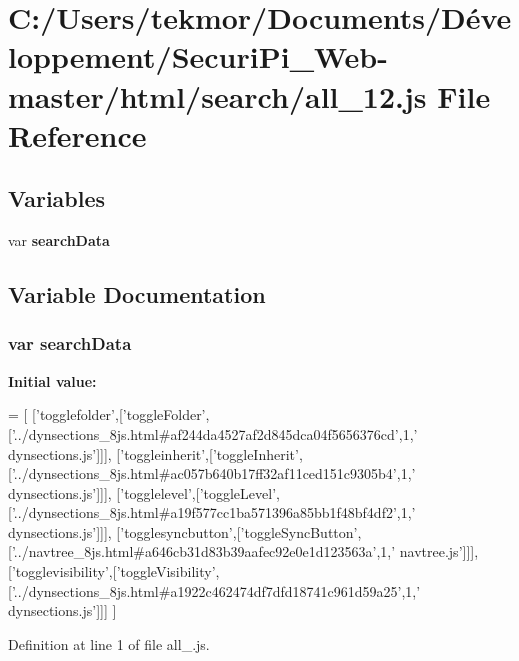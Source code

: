 \section{C\+:/\+Users/tekmor/\+Documents/\+Développement/\+Securi\+Pi\+\_\+\+Web-\/master/html/search/all\+\_\+12.js File Reference}
\label{all__12_8js}
\subsection*{Variables}
\begin{DoxyCompactItemize}
\item 
var {\bf search\+Data}
\end{DoxyCompactItemize}


\subsection{Variable Documentation}
\subsubsection[{search\+Data}]{\setlength{\rightskip}{0pt plus 5cm}var search\+Data}\label{all__12_8js_ad01a7523f103d6242ef9b0451861231e}
{\bfseries Initial value\+:}
\begin{DoxyCode}
=
[
  [\textcolor{stringliteral}{'togglefolder'},[\textcolor{stringliteral}{'toggleFolder'},[\textcolor{stringliteral}{'../dynsections\_8js.html#af244da4527af2d845dca04f5656376cd'},1,\textcolor{stringliteral}{'
      dynsections.js'}]]],
  [\textcolor{stringliteral}{'toggleinherit'},[\textcolor{stringliteral}{'toggleInherit'},[\textcolor{stringliteral}{'../dynsections\_8js.html#ac057b640b17ff32af11ced151c9305b4'},1,\textcolor{stringliteral}{'
      dynsections.js'}]]],
  [\textcolor{stringliteral}{'togglelevel'},[\textcolor{stringliteral}{'toggleLevel'},[\textcolor{stringliteral}{'../dynsections\_8js.html#a19f577cc1ba571396a85bb1f48bf4df2'},1,\textcolor{stringliteral}{'
      dynsections.js'}]]],
  [\textcolor{stringliteral}{'togglesyncbutton'},[\textcolor{stringliteral}{'toggleSyncButton'},[\textcolor{stringliteral}{'../navtree\_8js.html#a646cb31d83b39aafec92e0e1d123563a'},1,\textcolor{stringliteral}{'
      navtree.js'}]]],
  [\textcolor{stringliteral}{'togglevisibility'},[\textcolor{stringliteral}{'toggleVisibility'},[\textcolor{stringliteral}{'../dynsections\_8js.html#a1922c462474df7dfd18741c961d59a25'},1,\textcolor{stringliteral}{'
      dynsections.js'}]]]
]
\end{DoxyCode}


Definition at line 1 of file all\+\_.\+js.

